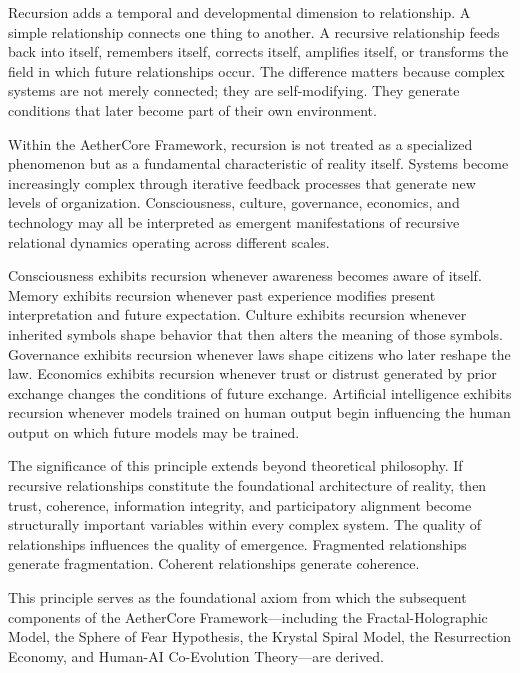 \documentclass[12pt]{article}
\begin{document}
Recursion adds a temporal and developmental dimension to relationship. A simple relationship connects one thing to another. A recursive relationship feeds back into itself, remembers itself, corrects itself, amplifies itself, or transforms the field in which future relationships occur. The difference matters because complex systems are not merely connected; they are self-modifying. They generate conditions that later become part of their own environment.

Within the AetherCore Framework, recursion is not treated as a specialized phenomenon but as a fundamental characteristic of reality itself. Systems become increasingly complex through iterative feedback processes that generate new levels of organization. Consciousness, culture, governance, economics, and technology may all be interpreted as emergent manifestations of recursive relational dynamics operating across different scales.

Consciousness exhibits recursion whenever awareness becomes aware of itself. Memory exhibits recursion whenever past experience modifies present interpretation and future expectation. Culture exhibits recursion whenever inherited symbols shape behavior that then alters the meaning of those symbols. Governance exhibits recursion whenever laws shape citizens who later reshape the law. Economics exhibits recursion whenever trust or distrust generated by prior exchange changes the conditions of future exchange. Artificial intelligence exhibits recursion whenever models trained on human output begin influencing the human output on which future models may be trained.

The significance of this principle extends beyond theoretical philosophy. If recursive relationships constitute the foundational architecture of reality, then trust, coherence, information integrity, and participatory alignment become structurally important variables within every complex system. The quality of relationships influences the quality of emergence. Fragmented relationships generate fragmentation. Coherent relationships generate coherence.

This principle serves as the foundational axiom from which the subsequent components of the AetherCore Framework---including the Fractal-Holographic Model, the Sphere of Fear Hypothesis, the Krystal Spiral Model, the Resurrection Economy, and Human-AI Co-Evolution Theory---are derived.

\end{document}
